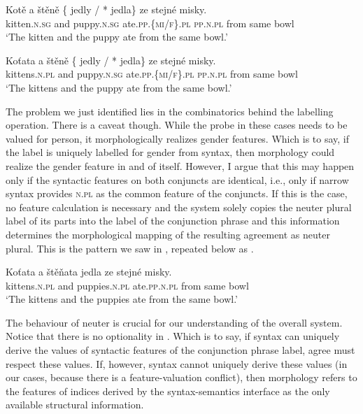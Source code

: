 \documentclass[output=paper,
modfonts
newtxmath,
hidelinks
]{langscibook}
\begin{document}
\ea\gll Kotě a štěně \{\hspace{-2pt} jedly / *\hspace{-2pt} jedla\} ze stejné misky.\label{n-a-rep}\\
kitten.\textsc{n.sg} and puppy.\textsc{n.sg} {} ate.\textsc{pp.\{mi/f\}.pl} {} {} \textsc{pp.n.pl} from same bowl\\
\glt `The kitten and the puppy ate from the same bowl.'\\\hfill{}
\z

\ea\gll Koťata a štěně \{\hspace{-2pt} jedly / *\hspace{-2pt} jedla\} ze stejné misky.\label{n-b-rep}\\
kittens.\textsc{n.pl} and puppy.\textsc{n.sg} {} ate.\textsc{pp.\{mi/f\}.pl} {} {} \textsc{pp.n.pl} from same bowl\\
\glt `The kittens and the puppy ate from the same bowl.'\\\hfill{}
\z

\noindent The problem we just identified lies in the combinatorics behind the labelling operation. There is a caveat though. While the probe in these cases needs to be valued for person, it morphologically realizes gender features. Which is to say, if the label is uniquely labelled for gender from syntax, then morphology could realize the gender feature in and of itself. However, I argue that this may happen only if the syntactic features on both conjuncts are identical, i.e., only if narrow syntax provides \textsc{n.pl} as the common feature of the conjuncts. If this is the case, no feature calculation is necessary and the system solely copies the neuter plural label of its parts into the label of the conjunction phrase and this information determines the morphological mapping of the resulting agreement as neuter plural. This is the pattern we saw in , repeated below as .

\ea\gll Koťata a štěňata jedla ze stejné misky.\label{n-c-rep}\\
kittens.\textsc{n.pl} and puppies.\textsc{n.pl} ate.\textsc{pp.n.pl} from same bowl\label{n-pl2}\\
\glt `The kittens and the puppies  ate from the same bowl.' \hfill{}
\z

\noindent The behaviour of neuter is crucial for our understanding of the overall system. Notice that there is no optionality in . Which is to say, if syntax can uniquely derive the values of syntactic features of the conjunction phrase label, agree must respect these values. If, however, syntax cannot uniquely derive these values (in our cases, because there is a feature-valuation conflict), then morphology refers to the features of indices derived by the syntax-semantics interface as the only available structural information.
\end{document}
